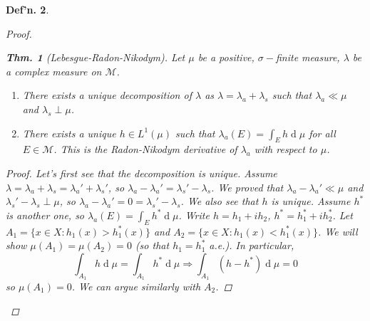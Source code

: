 \documentclass[12pt, a4paper]{book}
\renewcommand{\d}[1]{\ensuremath{\operatorname{d}\!{#1}}} %
\newtheorem{theorem}{Thm.}[section]
\newtheorem{definition}[theorem]{Def'n.}
\theoremstyle{nonumberplain}
\newtheorem{proof}{Proof}
\begin{document}
\begin{definition}
\begin{proof}
\begin{theorem}[Lebesgue-Radon-Nikodym]
    Let $\mu$ be a positive, $\sigma-$finite measure, $\lambda$ be a complex measure on $\mathcal{M}$.
    \begin{enumerate}[label=(\alph*)]
        \item There exists a unique decomposition of $\lambda$ as $\lambda=\lambda_a+\lambda_s$ such that $\lambda_a\ll\mu$ and $\lambda_s\perp\mu$.
        \item There exists a unique $h\in L^1(\mu)$ such that $\lambda_a(E)=\int_E h\d{\mu}$ for all $E\in\mathcal{M}$.
            This is the Radon-Nikodym derivative of $\lambda_a$ with respect to $\mu$.
    \end{enumerate}
\end{theorem}
\begin{proof}
    Let's first see that the decomposition is unique.
    Assume $\lambda=\lambda_a+\lambda_s=\lambda_a'+\lambda_s'$, so $\lambda_a-\lambda_a'=\lambda_s'-\lambda_s$.
    We proved that $\lambda_a-\lambda_a'\ll\mu$ and $\lambda_s'-\lambda_s\perp\mu$, so $\lambda_a-\lambda_a'=0=\lambda_s'-\lambda_s$.
    We also see that $h$ is unique.
    Assume $h^*$ is another one, so $\lambda_a(E)=\int_E h^*\d{\mu}$.
    Write $h=h_1+ih_2$, $h^*=h_1^*+ih_2^*$.
    Let $A_1=\{x\in X:h_1(x)>h_1^*(x)\}$ and $A_2=\{x\in X:h_1(x)<h_1^*(x)\}$.
    We will show $\mu(A_1)=\mu(A_2)=0$ (so that $h_1=h_1^*$ a.e.).
    In particular,
    \[\int_{A_1}h\d{\mu}=\int_{A_1}h^*\d{\mu}\Rightarrow\int_{A_1}(h-h^*)\d{\mu}=0\]
    so $\mu(A_1)=0$.
    We can argue similarly with $A_2$.


\end{proof}
\end{proof}
\end{definition}
\end{document}
